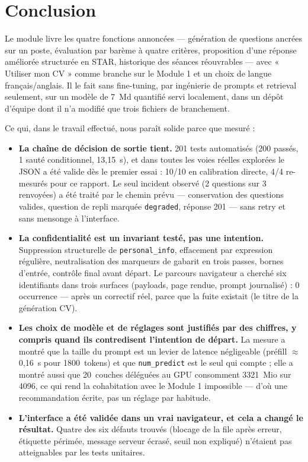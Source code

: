 \section{Conclusion}
\label{sec:conclusion}

Le module livre les quatre fonctions annoncées --- génération de questions
ancrées sur un poste, évaluation par barème à quatre critères, proposition d'une
réponse améliorée structurée en STAR, historique des séances réouvrables --- avec
« Utiliser mon CV » comme branche sur le Module 1 et un choix de langue
français/anglais. Il le fait sans fine-tuning, par ingénierie de prompts et
retrieval seulement, sur un modèle de 7~Md quantifié servi localement, dans un
dépôt d'équipe dont il n'a modifié que trois fichiers de branchement.

Ce qui, dans le travail effectué, nous paraît solide parce que mesuré :

\begin{itemize}[itemsep=2pt]
  \item \textbf{La chaîne de décision de sortie tient.} 201 tests automatisés
        (200 passés, 1 sauté conditionnel, 13,15~s), et dans toutes les voies
        réelles explorées le JSON a été valide dès le premier essai : 10/10 en
        calibration directe, 4/4 re-mesurés pour ce rapport. Le seul incident
        observé (2 questions sur 3 renvoyées) a été traité par le chemin prévu ---
        conservation des questions valides, question de repli marquée
        \texttt{degraded}, réponse 201 --- sans retry et sans mensonge à
        l'interface.
  \item \textbf{La confidentialité est un invariant testé, pas une intention.}
        Suppression structurelle de \texttt{personal\_info}, effacement par
        expression régulière, neutralisation des marqueurs de gabarit en trois
        passes, bornes d'entrée, contrôle final avant départ. Le parcours
        navigateur a cherché six identifiants dans trois surfaces (payloads, page
        rendue, prompt journalisé) : 0 occurrence --- après un correctif réel,
        parce que la fuite existait (le titre de la génération CV).
  \item \textbf{Les choix de modèle et de réglages sont justifiés par des
        chiffres, y compris quand ils contredisent l'intention de départ.} La
        mesure a montré que la taille du prompt est un levier de latence
        négligeable (préfill $\approx$0,16~s pour 1800~tokens) et que
        \texttt{num\_predict} est le seul qui compte ; elle a montré aussi que
        20~couches déléguées au GPU consomment 3321~Mio sur 4096, ce qui rend la
        cohabitation avec le Module 1 impossible --- d'où une recommandation
        écrite, pas un réglage par habitude.
  \item \textbf{L'interface a été validée dans un vrai navigateur, et cela a
        changé le résultat.} Quatre des six défauts trouvés (blocage de la file
        après erreur, étiquette périmée, message serveur écrasé, seuil non
        expliqué) n'étaient pas atteignables par les tests unitaires.
\end{itemize}


